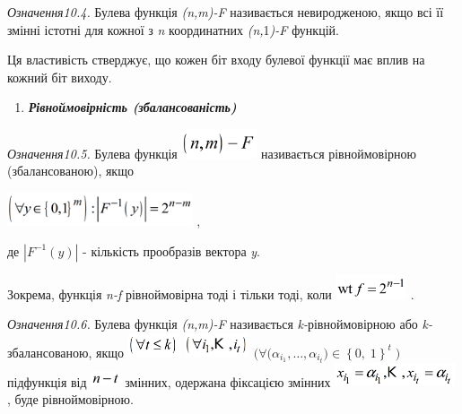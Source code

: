  \textit{Означення10.4.}\textit{ }Булева функція
\textit{(}\textit{n}\textit{,}\textit{m}\textit{)-}\textit{F}  називається
невиродженою, якщо всі її змінні істотні для кожної з \textit{n} координатних
\textit{(}\textit{n}\textit{,}1\textit{)-}\textit{F}  функцій.

Ця властивість стверджує, що кожен біт входу булевої функції має вплив на кожний
біт виходу.


\bigskip

\liststyleWWviiiNumxxix
\setcounter{saveenum}{\value{enumi}}
\begin{enumerate}
\setcounter{enumi}{\value{saveenum}}
\item {\bfseries\itshape
Рівноймовірність (збалансованість)}
\end{enumerate}
 \textit{Означення10.5.}\textit{ }Булева функція 
\includegraphics[width=0.8744in,height=0.3425in]{crypt-img/crypt-img196.png} 
називається рівноймовірною (збалансованою), якщо 

{\centering
 \includegraphics[width=2.1528in,height=0.389in]{crypt-img/crypt-img197.png} ,
\par}

де   ${|F^{{-1}}(y)|}$ - кількість прообразів вектора  \textit{y}.

Зокрема, функція \textit{n}\textit{{}-}\textit{f} рівноймовірна тоді і тільки
тоді, коли 
\includegraphics[width=0.8193in,height=0.278in]{crypt-img/crypt-img198.png} .

\textit{ }\textit{Означення10.6.}\textit{ }Булева функція
\textit{(}\textit{n}\textit{,}\textit{m}\textit{)-}\textit{F}  називається
\textit{k}\textit{{}-}рівноймовірною або \textit{k}\textit{{}-}збалансованою,
якщо 
\includegraphics[width=0.611in,height=0.278in]{crypt-img/crypt-img199.png}  
\includegraphics[width=0.75in,height=0.278in]{crypt-img/crypt-img200.png}  
${(\forall (\alpha _{{i_{{1}}}},\dots,\alpha _{i_{{t}}}{)\in
\left\{0,\;1\right\}^{t}}{\;)}}$  підфункція від 
\includegraphics[width=0.3465in,height=0.1665in]{crypt-img/crypt-img201.png} 
змінних, одержана фіксацією змінних 
\includegraphics[width=1.389in,height=0.278in]{crypt-img/crypt-img202.png} ,
буде рівноймовірною.  

